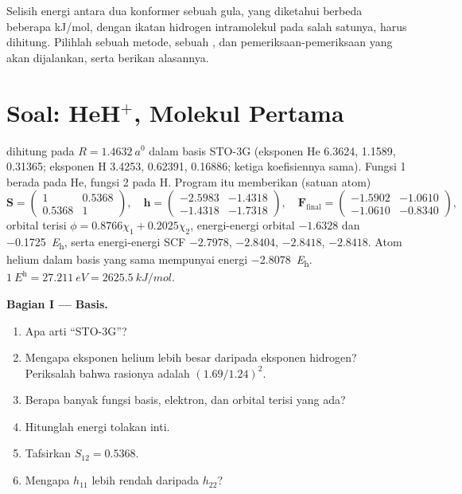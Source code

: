 \begin{exercise}[$\star\star\star$]\label{exo:b3:computational-chemistry:12}
Selisih energi antara dua konformer sebuah gula, yang diketahui berbeda
beberapa \unit{kJ/mol}, dengan ikatan hidrogen intramolekul pada salah
satunya, harus dihitung. Pilihlah sebuah metode, sebuah , dan
pemeriksaan-pemeriksaan yang akan dijalankan, serta berikan alasannya.
\end{exercise}

\section{Soal: HeH\texorpdfstring{$^+$}{+}, Molekul Pertama}

\begin{problem}
\label{pb:b3:computational-chemistry:1}
 dihitung pada $R = \qty{1.4632}{\bohr}$ dalam basis STO-3G
(eksponen He 6.3624, 1.1589, 0.31365; eksponen H 3.4253, 0.62391, 0.16886;
ketiga koefisiennya sama). Fungsi 1 berada pada He, fungsi 2 pada H. Program
itu memberikan (satuan atom)
\[
\mathbf S = \begin{pmatrix}1 & 0.5368\\ 0.5368 & 1\end{pmatrix},\quad
\mathbf h = \begin{pmatrix}-2.5983 & -1.4318\\ -1.4318 & -1.7318\end{pmatrix},\quad
\mathbf F_{\mathrm{final}} = \begin{pmatrix}-1.5902 & -1.0610\\ -1.0610 & -0.8340
\end{pmatrix},
\]
orbital terisi $\phi = 0.8766\chi_1 + 0.2025\chi_2$, energi-energi orbital
$-1.6328$ dan \qty{-0.1725}{\hartree}, serta energi-energi SCF $-2.7978$,
$-2.8404$, $-2.8418$, $-2.8418$. Atom helium dalam basis yang sama mempunyai
energi \qty{-2.8078}{\hartree}. $\qty{1}{\hartree} = \qty{27.211}{eV} =
\qty{2625.5}{kJ/mol}$.

\medskip\noindent\textbf{Bagian I --- Basis.}
\begin{enumerate}[beginpenalty=10000]
  \item Apa arti ``STO-3G''?
  \item Mengapa eksponen helium lebih besar daripada eksponen hidrogen?
        Periksalah bahwa rasionya adalah $(1.69/1.24)^2$.
  \item Berapa banyak fungsi basis, elektron, dan orbital terisi yang ada?
  \item Hitunglah energi tolakan inti.
  \item Tafsirkan $S_{12} = 0.5368$.
  \item Mengapa $h_{11}$ lebih rendah daripada $h_{22}$?
\end{enumerate}


\end{problem}
